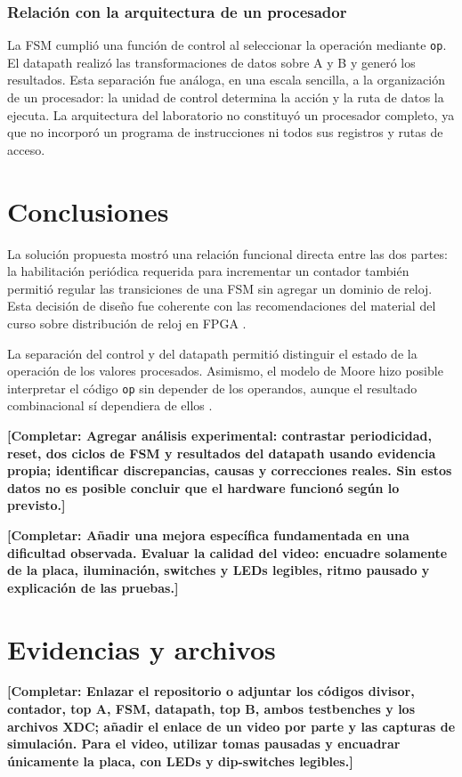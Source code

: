 \documentclass[conference]{IEEEtran}
\newcommand{\completar}[1]{\textcolor{pendiente}{\textbf{[Completar: #1]}}}
\begin{document}
\subsubsection{Relación con la arquitectura de un procesador}
La FSM cumplió una función de control al seleccionar la operación mediante \texttt{op}. El datapath realizó las transformaciones de datos sobre A y B y generó los resultados. Esta separación fue análoga, en una escala sencilla, a la organización de un procesador: la unidad de control determina la acción y la ruta de datos la ejecuta. La arquitectura del laboratorio no constituyó un procesador completo, ya que no incorporó un programa de instrucciones ni todos sus registros y rutas de acceso.

\section{Conclusiones}
La solución propuesta mostró una relación funcional directa entre las dos partes: la habilitación periódica requerida para incrementar un contador también permitió regular las transiciones de una FSM sin agregar un dominio de reloj. Esta decisión de diseño fue coherente con las recomendaciones del material del curso sobre distribución de reloj en FPGA \cite{cursodiv}.

La separación del control y del datapath permitió distinguir el estado de la operación de los valores procesados. Asimismo, el modelo de Moore hizo posible interpretar el código \texttt{op} sin depender de los operandos, aunque el resultado combinacional sí dependiera de ellos \cite{cursofsm}.

\completar{Agregar análisis experimental: contrastar periodicidad, reset, dos ciclos de FSM y resultados del datapath usando evidencia propia; identificar discrepancias, causas y correcciones reales. Sin estos datos no es posible concluir que el hardware funcionó según lo previsto.}

\completar{Añadir una mejora específica fundamentada en una dificultad observada. Evaluar la calidad del video: encuadre solamente de la placa, iluminación, switches y LEDs legibles, ritmo pausado y explicación de las pruebas.}

\section*{Evidencias y archivos}
\completar{Enlazar el repositorio o adjuntar los códigos divisor, contador, top A, FSM, datapath, top B, ambos testbenches y los archivos XDC; añadir el enlace de un video por parte y las capturas de simulación. Para el video, utilizar tomas pausadas y encuadrar únicamente la placa, con LEDs y dip-switches legibles.}
\end{document}
